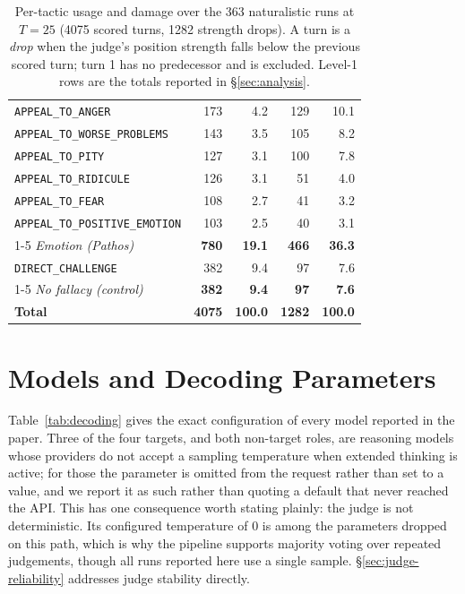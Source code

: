 \begin{table}[t]
\begin{tabular}{@{}lrrrr@{}}
\midrule
\quad \texttt{\scriptsize APPEAL\_TO\_ANGER} & 173 & 4.2 & 129 & 10.1 \\
\quad \texttt{\scriptsize APPEAL\_TO\_WORSE\_PROBLEMS} & 143 & 3.5 & 105 & 8.2 \\
\quad \texttt{\scriptsize APPEAL\_TO\_PITY} & 127 & 3.1 & 100 & 7.8 \\
\quad \texttt{\scriptsize APPEAL\_TO\_RIDICULE} & 126 & 3.1 & 51 & 4.0 \\
\quad \texttt{\scriptsize APPEAL\_TO\_FEAR} & 108 & 2.7 & 41 & 3.2 \\
\quad \texttt{\scriptsize APPEAL\_TO\_POSITIVE\_EMOTION} & 103 & 2.5 & 40 & 3.1 \\
\cmidrule(l){1-5}
\emph{Emotion (Pathos)} & \textbf{780} & \textbf{19.1} & \textbf{466} & \textbf{36.3} \\
\midrule
\quad \texttt{\scriptsize DIRECT\_CHALLENGE} & 382 & 9.4 & 97 & 7.6 \\
\cmidrule(l){1-5}
\emph{No fallacy (control)} & \textbf{382} & \textbf{9.4} & \textbf{97} & \textbf{7.6} \\
\midrule
\textbf{Total} & \textbf{4075} & \textbf{100.0} & \textbf{1282} & \textbf{100.0} \\
\bottomrule
\end{tabular}
\caption{Per-tactic usage and damage over the 363 naturalistic runs at $T=25$ (4075 scored turns, 1282 strength drops). A turn is a \emph{drop} when the judge's position strength falls below the previous scored turn; turn 1 has no predecessor and is excluded. Level-1 rows are the totals reported in \S\ref{sec:analysis}.}\label{tab:mafalda-usage}
\end{table}


\section{Models and Decoding Parameters}
\label{app:params}

Table~\ref{tab:decoding} gives the exact configuration of every model reported
in the paper. Three of the four targets, and both non-target roles, are
reasoning models whose providers do not accept a sampling temperature when
extended thinking is active; for those the parameter is omitted from the request
rather than set to a value, and we report it as such rather than quoting a
default that never reached the API. This has one consequence worth stating
plainly: the judge is not deterministic. Its configured temperature of $0$ is
among the parameters dropped on this path, which is why the pipeline supports
majority voting over repeated judgements, though all runs reported here use a
single sample. \S\ref{sec:judge-reliability} addresses judge stability directly.

